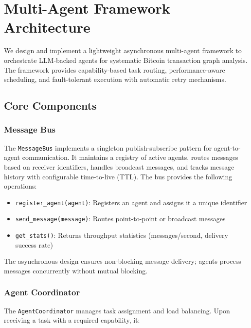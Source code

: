 
\section{Multi-Agent Framework Architecture}\label{sec:framework}

We design and implement a lightweight asynchronous multi-agent framework to orchestrate LLM-backed agents for systematic Bitcoin transaction graph analysis. The framework provides capability-based task routing, performance-aware scheduling, and fault-tolerant execution with automatic retry mechanisms.

\subsection{Core Components}

\subsubsection{Message Bus}
The \texttt{MessageBus} implements a singleton publish-subscribe pattern for agent-to-agent communication. It maintains a registry of active agents, routes messages based on receiver identifiers, handles broadcast messages, and tracks message history with configurable time-to-live (TTL). The bus provides the following operations:

\begin{itemize}
    \item \texttt{register\_agent(agent)}: Registers an agent and assigns it a unique identifier
    \item \texttt{send\_message(message)}: Routes point-to-point or broadcast messages  
    \item \texttt{get\_stats()}: Returns throughput statistics (messages/second, delivery success rate)
\end{itemize}

The asynchronous design ensures non-blocking message delivery; agents process messages concurrently without mutual blocking.

\subsubsection{Agent Coordinator}
The \texttt{AgentCoordinator} manages task assignment and load balancing. Upon receiving a task with a required capability, it:

